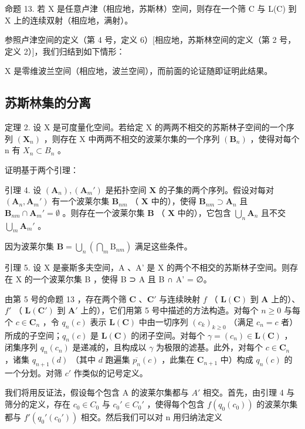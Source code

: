 命题 13. 若 X 是任意卢津（相应地，苏斯林）空间，则存在一个筛 C 与 L(C) 到 X 上的连续双射（相应地，满射）。

参照卢津空间的定义（第 4 号，定义 6）{[}相应地，苏斯林空间的定义（第 2 号，定义 2）{]}，我们归结到如下情形：

X 是零维波兰空间（相应地，波兰空间），而前面的论证随即证明此结果。

\subsection{苏斯林集的分离}

定理 2. 设 X 是可度量化空间。若给定 X 的两两不相交的苏斯林子空间的一个序列 \((\mathbf{X}_{n})\) ，则存在 X 中两两不相交的波莱尔集的一个序列 \((\mathbf{B}_{n})\) ，使得对每个 n 有 \(X_{n} \subset B_{n}\) 。

证明基于两个引理：

引理 4. 设 \((\mathbf{A}_n), (\mathbf{A}_m')\) 是拓扑空间 \(\mathbf{X}\) 的子集的两个序列。假设对每对 \((\mathbf{A}_n, \mathbf{A}_m')\) 有一个波莱尔集 \(\mathbf{B}_{nm}\) （ \(\mathbf{X}\) 中的），使得 \(\mathbf{B}_{nm} \supset \mathbf{A}_n\) 且 \(\mathbf{B}_{nm} \cap \mathbf{A}_m' = \emptyset\) 。则存在一个波莱尔集 \(\mathbf{B}\) （ \(\mathbf{X}\) 中的），它包含 \(\bigcup_{n} \mathbf{A}_n\) 且不交 \(\bigcup_{m} \mathbf{A}_m'\) 。

因为波莱尔集 \(\mathbf{B} = \bigcup_{n}\left(\bigcap_{m}\mathrm{B}_{nm}\right)\) 满足这些条件。

引理 5. 设 X 是豪斯多夫空间，A 、A' 是 X 的两个不相交的苏斯林子空间。则存在 X 的一个波莱尔集 B ，使得 B ⊃ A 且 B ∩ A' = ∅。

由第 5 号的命题 13 ，存在两个筛 \(\mathbf{C}\) 、\(\mathbf{C}'\) 与连续映射 \(f\) （ \(\mathbf{L}(\mathbf{C})\) 到 \(\mathbf{A}\) 上的）、\(f'\) （ \(\mathbf{L}(\mathbf{C}')\) 到 \(\mathbf{A}'\) 上的），它们用第 5 号中描述的方法构造。对每个 \(n \geqslant 0\) 与每个 \(c \in \mathbf{C}_n\) ，令 \(q_n(c)\) 表示 \(\mathbf{L}(\mathbf{C})\) 中由一切序列 \((c_k)_{k \geqslant 0}\) （满足 \(c_n = c\) 者）所成的子空间；\(q_n(c)\) 是 \(\mathbf{L}(\mathbf{C})\) 的闭子空间。对每个 \(\gamma = (c_n) \in \mathbf{L}(\mathbf{C})\) ，闭集序列 \(q_n(c_n)\) 是递减的，且构成以 \(\gamma\) 为极限的滤基。此外，对每个 \(c \in \mathbf{C}_n\) ，诸集 \(q_{n+1}(d)\) （其中 \(d\) 跑遍集 \(\overline{p_n}(c)\) ，此集在 \(\mathbf{C}_{n+1}\) 中）构成 \(q_n(c)\) 的一个分划。对筛 \(c'\) 作类似的记号定义。

我们将用反证法，假设每个包含 A 的波莱尔集都与 \(A'\) 相交。首先，由引理 4 与筛分的定义，存在 \(c_{0} \in C_{0}\) 与 \(c_{0}' \in C_{0}'\) ，使得每个包含 \(f(q_{0}(c_{0}))\) 的波莱尔集都与 \(f'(q_{0}'(c_{0}'))\) 相交。然后我们可以对 n 用归纳法定义

